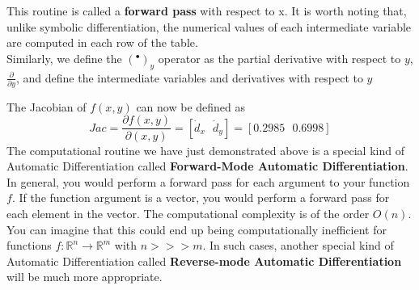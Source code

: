 	\centerline{ %
}

\vspace*{.2cm}

This routine is called a \textbf{forward pass} with respect to x. It is worth noting that, unlike symbolic differentiation, the numerical values of each intermediate variable are computed in each row of the table. \\

Similarly, we define the $(^\bullet)_y$ operator as the partial derivative with respect to $y$,  $\frac{\partial}{\partial y}$, and define the intermediate variables and derivatives with respect to $y$\\

	\centerline{ %
}

\vspace*{.2cm}

The Jacobian of $f(x,y)$ can now be defined as $$Jac = \frac{\partial f(x,y)}{\partial (x, y)} = [\dot{d}_x~~~\dot{d}_y] = [0.2985 ~~~ 0.6998]$$
The computational routine we have just demonstrated above is a special kind of Automatic Differentiation called \textbf{Forward-Mode Automatic Differentiation}. \\

In general, you would perform a forward pass for each argument to your function $f$. If the function argument is a vector, you would perform a forward pass for each element in the vector. The computational complexity is of the order $O(n)$. You can imagine that this could end up being computationally inefficient for functions $f : \mathbb{R}^n \rightarrow \mathbb{R}^m$ with $n >>> m$. In such cases, another special kind of Automatic Differentiation called \textbf{Reverse-mode Automatic Differentiation} will be much more appropriate. \\

